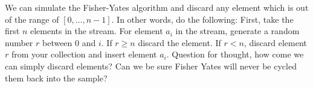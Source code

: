 We can simulate the Fisher-Yates algorithm and discard any element which is out
of the range of $[0,\ldots,n-1]$. In other words, do the following:
First, take the first $n$ elements in the stream.
For element $a_i$ in the stream, generate a random number $r$ between $0$ and $i$.
If $r \ge n$ discard the element. If $r<n$, discard element $r$ from your collection and insert element $a_i$.
Question for thought, how come we can simply discard elements? Can we be sure Fisher Yates will never be cycled them back into the sample?

















